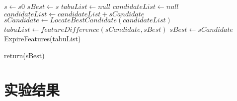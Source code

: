 \begin{algorithmic}

\State $s \gets s0$
\State $sBest \gets s$
\State $tabuList \gets null$
    \State $candidateList \gets null$ 
            \State $candidateList \gets candidateList + sCandidate$
        \EndIf
    \EndFor
    \State $sCandidate \gets LocateBestCandidate(candidateList)$
        \State $tabuList \gets featureDifference(sCandidate,sBest)$
        \State $sBest \gets sCandidate$
            \State ExpireFeatures(tabuList)
        \EndWhile

    \EndIf

\EndWhile    
\State return(sBest)

\end{algorithmic}

\section{实验结果}

